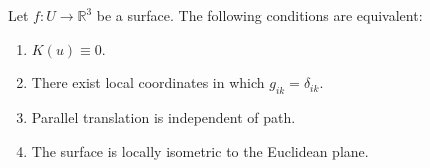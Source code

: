 Let $f: U \to \mathbb{R}^3$ be a surface. The following conditions are equivalent:

\begin{enumerate}
\item[(i)] $K(u) \equiv 0$.
\item[(ii)] There exist local coordinates in which $g_{ik} = \delta_{ik}$.
\item[(iii)] Parallel translation is independent of path.
\item[(iv)] The surface is locally isometric to the Euclidean plane.
\end{enumerate}
